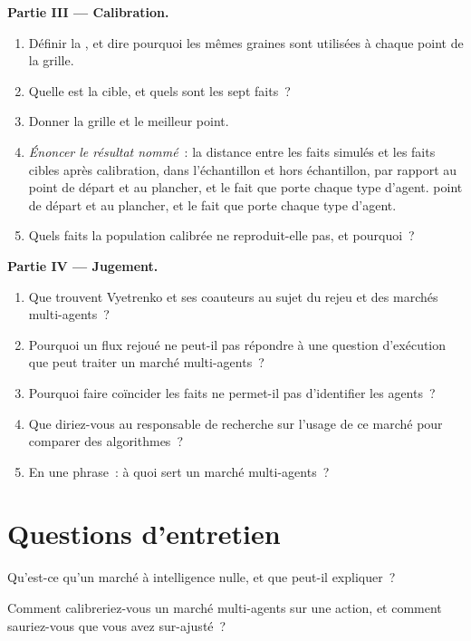 \begin{problem}
\medskip\noindent\textbf{Partie III --- Calibration.}
\begin{enumerate}[resume]
\item Définir la , et dire pourquoi les mêmes graines sont utilisées à chaque point de la grille.
\item Quelle est la cible, et quels sont les sept faits~?
\item Donner la grille et le meilleur point.
\item \emph{Énoncer le résultat nommé}~: la distance entre les faits simulés et les faits cibles après calibration, dans l'échantillon et hors échantillon, par rapport au point de départ et au plancher, et le fait que porte chaque type d'agent.
point de départ et au plancher, et le fait que porte chaque type d'agent.
\item Quels faits la population calibrée ne reproduit-elle pas, et pourquoi~?
\end{enumerate}

\medskip\noindent\textbf{Partie IV --- Jugement.}
\begin{enumerate}[resume]
\item Que trouvent Vyetrenko et ses coauteurs au sujet du rejeu et des marchés multi-agents~?
\item Pourquoi un flux rejoué ne peut-il pas répondre à une question d'exécution que peut traiter un marché multi-agents~?
\item Pourquoi faire coïncider les faits ne permet-il pas d'identifier les agents~?
\item Que diriez-vous au responsable de recherche sur l'usage de ce marché pour comparer des algorithmes~?
\item En une phrase~: à quoi sert un marché multi-agents~?
\end{enumerate}
\end{problem}

\section{Questions d'entretien}

\begin{interviewq}\label{iq:mx:build-an-agent-based-market:1}
Qu'est-ce qu'un marché à intelligence nulle, et que peut-il expliquer~?
\end{interviewq}

\begin{interviewq}\label{iq:mx:build-an-agent-based-market:2}
Comment calibreriez-vous un marché multi-agents sur une action, et comment sauriez-vous que vous avez sur-ajusté~?
\end{interviewq}

